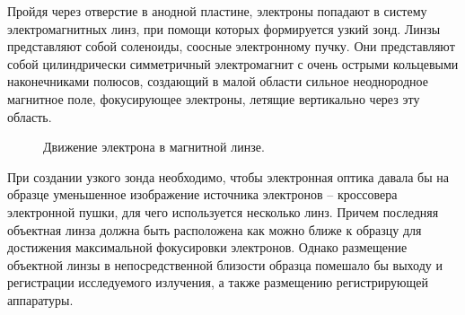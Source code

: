 \documentclass[a4paper,12pt]{article}	%
\begin{document}
\medskip
        
\noindent Пройдя через отверстие в анодной пластине, электроны попадают в систему электромагнитных линз, при помощи которых формируется узкий зонд. Линзы представляют собой соленоиды, соосные электронному пучку. Они представляют собой цилиндрически симметричный электромагнит с очень острыми кольцевыми наконечниками полюсов, создающий в малой области сильное неоднородное магнитное поле, фокусирующее электроны, летящие вертикально через эту область.   

        \begin{figure}[h!]
            \caption{Движение электрона в магнитной линзе.}
            \label{движение электрона}
        \end{figure}
        
\noindent При создании узкого зонда необходимо, чтобы электронная оптика давала бы на образце уменьшенное изображение источника электронов – кроссовера электронной пушки, для чего используется несколько линз. Причем последняя объектная линза должна быть расположена как можно ближе к образцу для достижения максимальной фокусировки электронов. Однако размещение объектной линзы в непосредственной близости образца помешало бы выходу и регистрации исследуемого излучения, а также размещению регистрирующей аппаратуры.
\end{document}

